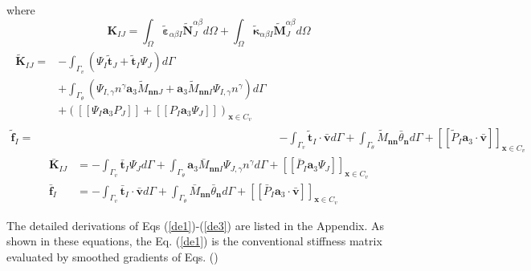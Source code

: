 where
\begin{equation}\label{de1}
        \boldsymbol K_{IJ} = \int_\Omega \tilde{\boldsymbol \varepsilon}_{\alpha\beta I} \tilde{\boldsymbol N}^{\alpha\beta}_J d\Omega + \int_\Omega \tilde{\boldsymbol \kappa}_{\alpha\beta I} \tilde{\boldsymbol M}^{\alpha\beta}_J d\Omega
\end{equation}
\begin{subequations}\label{de2}
\begin{align}
\begin{split}
        \tilde{\boldsymbol K}_{IJ} = &- \int_{\Gamma_v} (\Psi_I \tilde{\boldsymbol t}_J + \tilde{\boldsymbol t}_I \Psi_J) d\Gamma \\
                                     &+ \int_{\Gamma_\theta} (\Psi_{I,\gamma} n^\gamma \boldsymbol a_3 \tilde M_{\boldsymbol{nn}J} + \boldsymbol a_3 \tilde M_{\boldsymbol{nn}I} \Psi_{I,\gamma}n^\gamma)d\Gamma \\
                                     & + ([[\Psi_I \boldsymbol a_3 P_J]] + [[P_I \boldsymbol a_3 \Psi_J]])_{\boldsymbol x \in C_v}
\end{split} \\
\tilde{\boldsymbol f}_I = &- \int_{\Gamma_v} \tilde{\boldsymbol t}_I \cdot \bar{\boldsymbol v} d\Gamma + \int_{\Gamma_\theta} \tilde M_{\boldsymbol{nn}} \bar{\theta}_{\boldsymbol n} d\Gamma + [[\tilde P_I\boldsymbol a_3 \cdot \bar{\boldsymbol v}]]_{\boldsymbol x \in C_v}
\end{align}
\end{subequations}
\begin{subequations}\label{de3}
\begin{align}
\bar{\boldsymbol K}_{IJ} &= - \int_{\Gamma_v} \bar{\boldsymbol t}_I \Psi_J d\Gamma 
+ \int_{\Gamma_\theta} \boldsymbol a_3\bar M_{\boldsymbol{nn}I} \Psi_{J,\gamma}n^\gamma d\Gamma + [[\bar P_I \boldsymbol a_3 \Psi_J]]_{\boldsymbol x \in C_v} \\
\bar{\boldsymbol f}_I &= - \int_{\Gamma_v} \bar{\boldsymbol t}_I \cdot \bar{\boldsymbol v} d\Gamma + \int_{\Gamma_\theta} \bar M_{\boldsymbol{nn}} \bar{\theta}_{\boldsymbol n} d\Gamma + [[\bar P_I\boldsymbol a_3 \cdot \bar{\boldsymbol v}]]_{\boldsymbol x \in C_v}
\end{align}
\end{subequations}

The detailed derivations of Eqs (\ref{de1})-(\ref{de3}) are listed in the Appendix. As shown in these equations, the Eq. (\ref{de1}) is the conventional stiffness matrix evaluated by smoothed gradients of Eqs. ()
